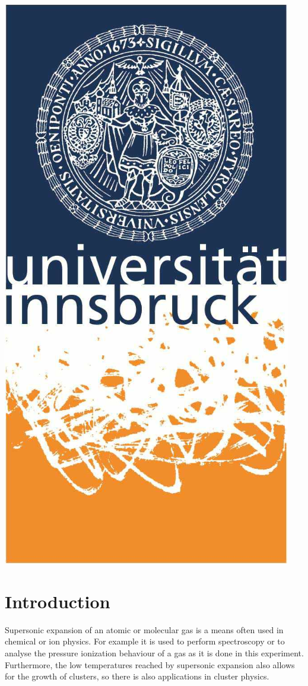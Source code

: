\documentclass[a4paper,10pt]{article}
\begin{document}
\begin{titlepage}
	\begin{center}
	\includegraphics[scale=0.4]{img/uibk}
	\end{center}

\end{titlepage}

\section{Introduction}
Supersonic expansion of an atomic or molecular gas is a means often used in chemical or ion physics. For example it is used to perform spectroscopy \cite{demtroeder} or to analyse the pressure ionization behaviour  of a gas as it is done in this experiment. Furthermore, the low temperatures reached by supersonic expansion also allows for the growth of clusters, so there is also applications in cluster physics.
\end{document}
